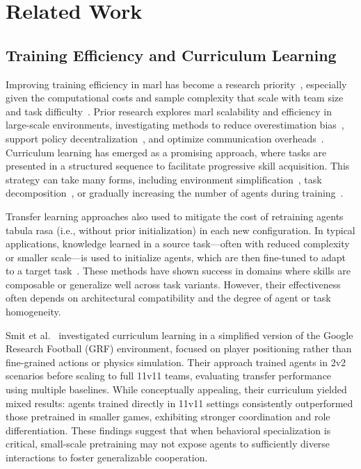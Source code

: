 \section{Related Work}
\subsection{Training Efficiency and Curriculum Learning}

Improving training efficiency in \gls{marl} has become a research 
priority~\cite{canese2021,krouka2022}, especially given the computational costs and sample 
complexity that scale with team size and task difficulty~\cite{shoham2007,busoniu2008}. 
Prior research explores \gls{marl} scalability and efficiency in large-scale environments, 
investigating methods to reduce overestimation bias~\cite{ackermann2019}, 
support policy decentralization~\cite{foerster2018,lowe2020}, 
and optimize communication overheads~\cite{sukhbaatar2016,wei2022}. 
Curriculum learning has emerged as a promising approach, where tasks are 
presented in a structured sequence to facilitate progressive skill acquisition. 
This strategy can take many forms, including environment simplification~\cite{shukla2022}, 
task decomposition~\cite{shi2023}, or gradually increasing the number of agents 
during training~\cite{smit2023, albrecht2024}.

Transfer learning approaches also used to mitigate the cost of retraining agents 
tabula rasa (i.e., without prior initialization) in each new configuration. 
In typical applications, knowledge learned in a source task—often with reduced 
complexity or smaller scale—is used to initialize agents, 
which are then fine-tuned to adapt to a target task~\cite{cui2022}. 
These methods have shown success in domains where skills are composable 
or generalize well across task variants. However, their effectiveness often 
depends on architectural compatibility and the degree of agent or task homogeneity.

Smit et al.~\cite{smit2023} investigated curriculum learning in a simplified version of the 
Google Research Football (GRF) environment, focused on player positioning rather than 
fine-grained actions or physics simulation. Their approach trained agents in 2v2 scenarios 
before scaling to full 11v11 teams, evaluating transfer performance using multiple baselines. 
While conceptually appealing, their curriculum yielded mixed results: agents trained directly 
in 11v11 settings consistently outperformed those pretrained in smaller games, exhibiting 
stronger coordination and role differentiation. These findings suggest that when behavioral 
specialization is critical, small-scale pretraining may not expose agents to sufficiently 
diverse interactions to foster generalizable cooperation.

